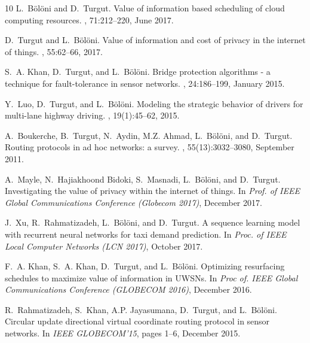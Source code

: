 \begin{thebibliography}{10}
          L.~B{\"o}l{\"o}ni and D.~Turgut.
          \newblock Value of information based scheduling of cloud computing resources.
          , 71:212--220, June 2017.

          D.~Turgut and L.~B{\"o}l{\"o}ni.
          \newblock Value of information and cost of privacy in the internet of things.
          , 55:62--66, 2017.

          S.~A. Khan, D.~Turgut, and L.~B{\"o}l{\"o}ni.
          \newblock Bridge protection algorithms - a technique for fault-tolerance in
            sensor networks.
          , 24:186--199, January 2015.

Y.~Luo, D.~Turgut, and L.~B{\"o}l{\"o}ni.
\newblock Modeling the strategic behavior of drivers for multi-lane highway
  driving.
, 19(1):45--62,
  2015.

  A.~Boukerche, B.~Turgut, N.~Aydin, M.Z. Ahmad, L.~B{\"o}l{\"o}ni, and
    D.~Turgut.
  \newblock Routing protocols in ad hoc networks: a survey.
  , 55(13):3032--3080, September 2011.

  A.~Mayle, N.~Hajiakhoond Bidoki, S.~Masnadi, L.~B{\"o}l{\"o}ni, and D.~Turgut.
  \newblock Investigating the value of privacy within the internet of things.
  \newblock In {\em Prof. of IEEE Global Communications Conference (Globecom
    2017)}, December 2017.

  J.~Xu, R.~Rahmatizadeh, L.~B{\"o}l{\"o}ni, and D.~Turgut.
  \newblock A sequence learning model with recurrent neural networks for taxi
    demand prediction.
  \newblock In {\em Proc. of IEEE Local Computer Networks (LCN 2017)}, October
    2017.

    F.~A. Khan, S.~A. Khan, D.~Turgut, and L.~B{\"o}l{\"o}ni.
    \newblock Optimizing resurfacing schedules to maximize value of information in
      {UWSN}s.
    \newblock In {\em Proc of. IEEE Global Communications Conference (GLOBECOM
      2016)}, December 2016.


      R.~Rahmatizadeh, S.~Khan, A.P. Jayasumana, D.~Turgut, and L.~B{\"o}l{\"o}ni.
      \newblock Circular update directional virtual coordinate routing protocol in
        sensor networks.
      \newblock In {\em IEEE GLOBECOM'15}, pages 1--6, December 2015.

\end{thebibliography}
